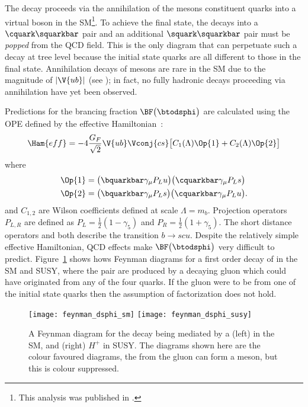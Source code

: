 The decay \btodsphi proceeds via the annihilation of the \Bp mesons constituent quarks into
a virtual \Wp boson in the SM\footnote{
  This analysis was published in .}.
To achieve the final state, the \Wp decays into a $\cquark\squarkbar$ pair and an additional
$\squark\squarkbar$ pair must be \emph{popped} from the QCD field.
This is the only diagram that can perpetuate such a decay at tree level because the initial state
quarks are all different to those in the final state.
Annihilation decays of \Bp mesons are rare in the SM due to the magnitude of $|\V{ub}|$ (see
); in fact, no fully hadronic decays proceeding via annihilation have yet been
observed.


Predictions for the brancing fraction $\BF\big(\btodsphi\big)$ are calculated using the OPE defined
by the effective Hamiltonian~\cite{Zou:2009zza,Mohanta:2002wf,PhysRevD.76.057701,Lu:2001yz}:
\begin{equation}
  \Ham{eff}=
  -4\frac{G_F}{\sqrt{2}} \V{ub}\Vconj{cs}
  \big[
    C_1(\Lambda)\Op{1}+C_2(\Lambda)\Op{2}
    \big]
\end{equation}
where
\begin{align}
  \Op{1} &= \big(\bquarkbar\gamma_\mu P_Lu\big) \big(\cquarkbar\gamma_\mu P_Ls\big) \nonumber\\
  \Op{2} &= \big(\bquarkbar\gamma_\mu P_Ls\big) \big(\cquarkbar\gamma_\mu P_Lu\big).
\end{align}
and $C_{1,2}$ are Wilson coefficients defined at scale $\Lambda=m_b$.
Projection operators $P_{L,R}$ are defined as $P_L=\tfrac12(1-\gamma_5)$ and
$P_R=\tfrac12(1+\gamma_5)$.
The short distance operators  and  both describe the transition $b\!\to scu$.
Despite the relatively simple effective Hamiltonian, QCD effects make $\BF\big(\btodsphi\big)$ very
difficult to predict.
Figure~\ref{fig:dsphi:feyn} shows hows Feynman diagrams for a first order decay of \btodsphi in the
SM and SUSY, where the \ssbar pair are produced by a decaying gluon which could have
originated from any of the four quarks.
If the gluon were to be from one of the initial state quarks then the assumption of factorization
does not hold.


\begin{figure}
  \begin{center}
    \texttt{[image: feynman\_dsphi\_sm]}
    \texttt{[image: feynman\_dsphi\_susy]}
    \caption[Feynman diagram for the decay \btodsphi]
    {\small
      A Feynman diagram for the decay \btodsphi being mediated by a
      (left) \Wp in the SM, and
      (right) $H^+$ in SUSY.
      The diagrams shown here are the colour favoured diagrams, the \ssbar from the gluon can form
      a \phii meson, but this is colour suppressed.
    }
    \label{fig:dsphi:feyn}
  \end{center}
\end{figure}



